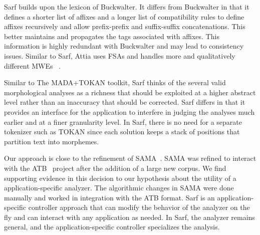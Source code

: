 \documentclass[a4,12pt]{report}
\begin{document}
Sarf builds upon the lexicon of Buckwalter\cite{Buckwalter:02}.
It differs from Buckwalter in that it defines a shorter list of affixes
and a longer list of 
compatibility rules to define 
affixes recursively and allow 
prefix-prefix and suffix-suffix 
concatenations.
This better maintains and propagates 
the tags associated with affixes.  
This information is highly 
redundant with Buckwalter and may lead to consistency issues. 
Similar to Sarf, Attia uses FSAs and handles more and qualitatively different MWEs
~\cite{Attia:06,Attia:10}.


Similar to The MADA+TOKAN toolkit, Sarf thinks of
the several valid morphological analyses as a richness that 
should be exploited at a higher abstract level rather than
an inaccuracy that should be corrected. 
Sarf differs in that it provides an interface for the 
application to interfere in judging the analyses much earlier and
at a finer granularity level. 
In Sarf, there is no need for a separate tokenizer such as
TOKAN since each solution keeps a stack of positions
that partition text into morphemes.


Our approach is close to the refinement of SAMA~\cite{Maamouri:10}.
SAMA was refined to interact with
the ATB~\cite{Maamouri:04} project after the addition of a large 
new corpus. 
We find supporting evidence in this decision to our hypothesis
about the utility of a application-specific analyzer. 
The algorithmic changes in SAMA were
done manually and worked in integration with the ATB format. 
Sarf is an application-specific controller approach that can modify 
the behavior of the analyzer on the fly and can interact
with any application as needed. 
In Sarf, the analyzer remains general, and the 
application-specific controller specializes the analysis.
\end{document}
